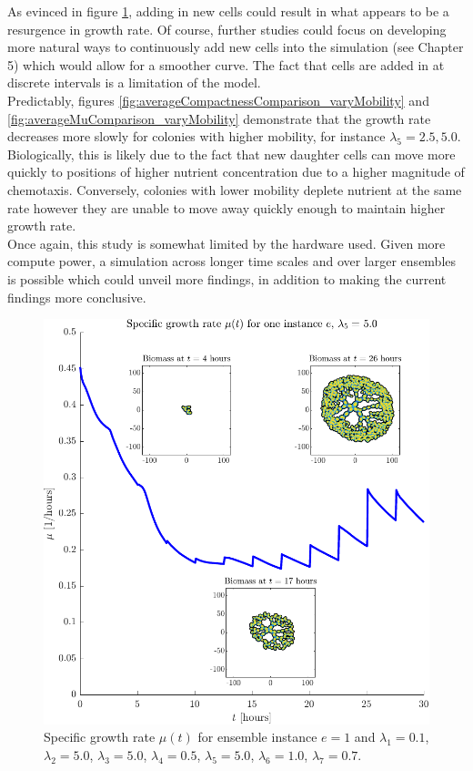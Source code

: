 As evinced in figure \ref{fig:MuSingleInstance5.0}, adding in new cells 
could result in what appears to be a resurgence in growth rate. Of course,
further studies could focus on developing more natural ways to continuously add new cells into the 
simulation (see Chapter 5) which would allow for a smoother curve.
The fact that cells are added in at discrete intervals is a limitation of the model.
\\

Predictably, figures \ref{fig:averageCompactnessComparison_varyMobility} 
and \ref{fig:averageMuComparison_varyMobility} demonstrate 
that the growth rate decreases more slowly for colonies with higher 
mobility, for instance $\lambda_5 = 2.5, 5.0$. Biologically,
this is likely due to the fact that new daughter cells can move more
quickly to positions of higher nutrient concentration due to a 
higher magnitude of chemotaxis. Conversely, colonies with lower mobility
deplete nutrient at the same rate however they are 
unable to move away quickly enough to maintain higher growth rate.
\\

Once again, this study is somewhat limited by the hardware used. 
Given more compute power, a simulation across longer time scales and 
over larger ensembles is 
possible which could unveil more findings, in addition to 
making the current findings more conclusive.


\begin{figure}[!htb]
    \centering
    \includegraphics[width= \textwidth]{
        chapter4/figures/Inset_L1_0o10_L2_5o00_L3_5o00_L4_0o50_L5_5o00_L6_1o00_L7_0o70.pdf}
    \caption{Specific growth rate $\mu(t)$ for ensemble instance $e = 1$ and 
             $\lambda_1 = 0.1$,  
             $\lambda_2 = 5.0$, 
             $\lambda_3 = 5.0$, 
             $\lambda_4 = 0.5$, 
             $\lambda_5 = 5.0$, 
             $\lambda_6 = 1.0$, 
             $\lambda_7 = 0.7$.}
    \label{fig:MuSingleInstance5.0}
\end{figure}

